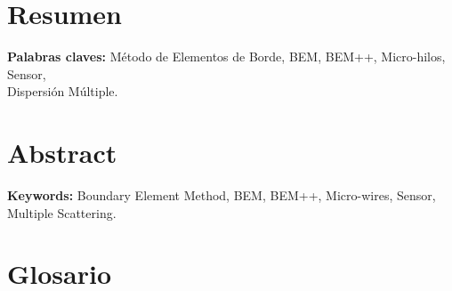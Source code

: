 \section*{Resumen}
\noindent\textbf{Palabras claves:} Método de Elementos de Borde, BEM, BEM++, Micro-hilos, Sensor,\\ Dispersión Múltiple.
\pagebreak
\section*{Abstract}

\noindent\textbf{Keywords:} Boundary Element Method, BEM, BEM++, Micro-wires, Sensor,\\ Multiple Scattering.
\pagebreak
\section*{Glosario}
